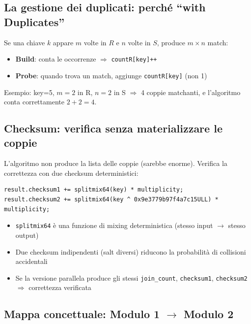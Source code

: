 \documentclass[11pt,a4paper]{article}
\begin{document}
\subsection{La gestione dei duplicati: perché ``with Duplicates''}

Se una chiave $k$ appare $m$ volte in $R$ e $n$ volte in $S$, produce $m \times n$ match:

\begin{itemize}[nosep]
  \item \textbf{Build}: conta le occorrenze $\Rightarrow$ \lstinline{countR[key]++}
  \item \textbf{Probe}: quando trova un match, aggiunge \lstinline{countR[key]} (non 1)
\end{itemize}

Esempio: key=5, $m=2$ in R, $n=2$ in S $\Rightarrow$ 4 coppie matchanti, e l'algoritmo conta correttamente $2+2=4$.


\subsection{Checksum: verifica senza materializzare le coppie}

L'algoritmo non produce la lista delle coppie (sarebbe enorme). Verifica la correttezza con due checksum deterministici:

\begin{lstlisting}[style=cpp,numbers=none]
result.checksum1 += splitmix64(key) * multiplicity;
result.checksum2 += splitmix64(key ^ 0x9e3779b97f4a7c15ULL) * multiplicity;
\end{lstlisting}

\begin{itemize}[nosep]
  \item \texttt{splitmix64} è una funzione di mixing deterministica (stesso input $\to$ stesso output)
  \item Due checksum indipendenti (salt diversi) riducono la probabilità di collisioni accidentali
  \item Se la versione parallela produce gli stessi \texttt{join\_count}, \texttt{checksum1}, \texttt{checksum2} $\Rightarrow$ correttezza verificata
\end{itemize}


\subsection{Mappa concettuale: Modulo 1 $\to$ Modulo 2}
\end{document}
